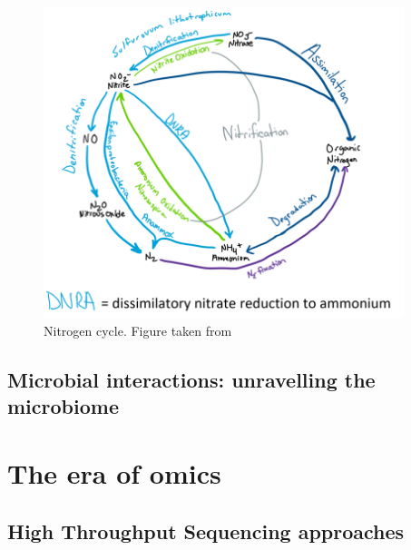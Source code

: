    \begin{figure}[h]
      \centering
      \includegraphics[width=105mm]{figures/802px-Nitrogen_cycle_of_hydrothermal_vents_2.png}
      \caption{Nitrogen cycle. Figure taken from \citep{wiki:nitrogen}}
   \end{figure}





\subsection{Microbial interactions: unravelling the microbiome}




\newpage

\section{The era of omics}

\subsection{High Throughput Sequencing approaches}

